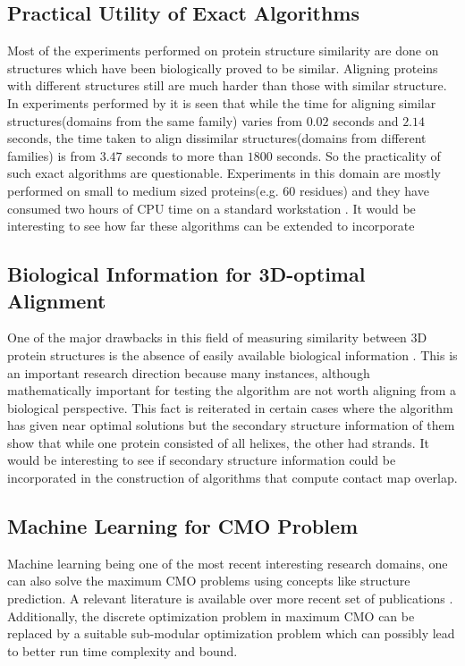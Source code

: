 \subsection{Practical Utility of Exact Algorithms}
Most of the experiments performed on protein structure similarity are done on structures which have been biologically proved to be similar. Aligning proteins with different structures still are much harder than those with similar structure. In experiments performed by \citet{anmy11} it is seen that while the time for aligning similar structures(domains from the same family) varies from $0.02$ seconds and $2.14$ seconds, the time taken to align dissimilar structures(domains from different families) is from $3.47$ seconds to more than $1800$ seconds. So the practicality of such exact algorithms are questionable. Experiments in this domain are mostly performed on small to medium sized proteins(e.g. 60 residues) and they have consumed two hours of CPU time on a standard workstation \citep{xie07}. It would be interesting to see how far these algorithms can be extended to incorporate
\vspace{-0.1cm}
\subsection{Biological Information for 3D-optimal Alignment}
One of the major drawbacks in this field of measuring similarity between 3D protein structures is the absence of easily available biological information \citep{xie07}. This is an important research direction because many instances, although mathematically important for testing the algorithm are not worth aligning from a biological perspective. This fact is reiterated in certain cases where the algorithm has given near optimal solutions but the secondary structure information of them show that while one protein consisted of all helixes, the other had strands. It would be interesting to see if secondary structure information could be incorporated in the construction of algorithms that compute contact map overlap.
\vspace{-0.1cm}
\subsection{Machine Learning for CMO Problem}
Machine learning being one of the most recent interesting research domains, one can also solve the maximum CMO problems using concepts like structure prediction. A relevant literature is available over more recent set of publications \citep{ksck13,hozr13,zhhz05,wewm05,terp10,vupf08}. Additionally, the discrete optimization problem in maximum CMO can be replaced by a suitable sub-modular optimization problem \citep{iybi12,iybi13,iyjb13} which can possibly lead to better run time complexity and bound.

